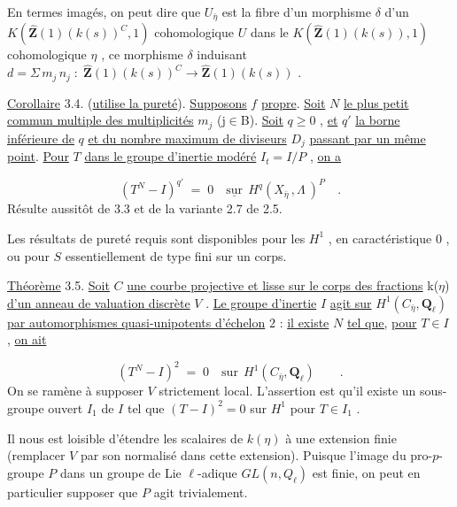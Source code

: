 En termes imagés, on peut dire que  $U_{\bar{\eta}}$  est la fibre d'un morphisme  $\delta$  d'un $K(\hat{\mathbf{Z}}(1)(k(s))^{C},1)$  cohomologique  $U$  dans le  $K(\hat{\mathbf{Z}}(1)(k(s)),1)$  cohomologique  $\eta$ , ce morphisme  $\delta$  induisant  $d = \Sigma\, m_{j}\, n_{j} \;:\; \hat{\mathbf{Z}}(1)(k(s))^{C} \longrightarrow \hat{\mathbf{Z}}(1)(k(s))$ .

\underline{Corollaire} 3.4. (\underline{utilise la pureté}). \underline{Supposons} $f$ \underline{propre}. \underline{Soit} $N$ \underline{le plus petit commun multiple des multiplicités} $m_{j}$ (j$\in$B). \underline{Soit} $q \geqslant 0$ , \underline{et} $q'$ \underline{la borne inférieure de} $q$ \underline{et du nombre maximum de diviseurs} $D_{j}$ \underline{passant par un même point}. \underline{Pour} $T$ \underline{dans le groupe d'inertie modéré} $I_{t} =I/P$ , \underline{on a}

\begin{equation*}
(T^{N} - I)^{q'} \;=\; 0 \quad \underline{\text{sur}} \ \ H^{q}(X_{\bar{\eta}} \,,\Lambda\ )^{P} \quad .
\end{equation*}
Résulte aussitôt de 3.3 et de la variante 2.7 de 2.5.

Les résultats de pureté requis sont disponibles pour les  $H^{1}$ , en caractéristique $0$ , ou pour  $S$  essentiellement de type fini sur un corps.

\underline{Théorème} 3.5. \underline{Soit} $C$ \underline{une courbe projective et lisse sur le corps des fractions} k($\eta$) \underline{d'un anneau de valuation discrète} $V$ . \underline{Le groupe d'inertie} $I$ \underline{agit sur} $H^{1}(C_{\bar{\eta}},\mathbf{Q}_{\ell})$ \underline{par automorphismes quasi-unipotents d'échelon} $2$ : \underline{il existe} $N$ \underline{tel que,} \underline{pour} $T \in I$ , \underline{on ait}

\begin{equation*}
(T^{N} - I)^{2} \;=\; 0 \quad \text{sur} \ \ H^{1}(C_{\bar{\eta}},\mathbf{Q}_{\ell}) \qquad .
\end{equation*}
On se ramène à supposer  $V$  strictement local. L'assertion est qu'il existe un sous-groupe ouvert  $I_{1}$  de  $I$  tel que  $(T - I)^{2} = 0$  sur  $H^{1}$  pour  $T \in I_{1}$ .


Il nous est loisible d'étendre les scalaires de  $k(\eta)$  à une extension finie (remplacer  $V$  par son normalisé dans cette extension). Puisque l'image du pro-$p$-groupe  $P$  dans un groupe de  Lie $\ell$-adique  $GL(n,Q_\ell)$  est finie, on peut en particulier supposer que  $P$  agit trivialement.

